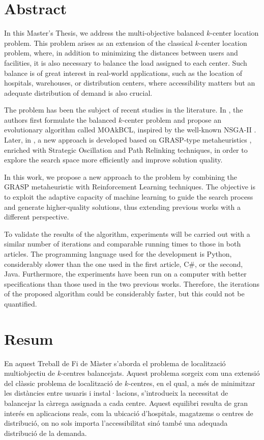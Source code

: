 \documentclass[12pt,a4paper]{book}
\begin{document}
\section*{Abstract}
In this Master's Thesis, we address the multi-objective balanced $k$-center location problem. This problem arises as an extension of the classical $k$-center location problem, where, in addition to minimizing the distances between users and facilities, it is also necessary to balance the load assigned to each center. Such balance is of great interest in real-world applications, such as the location of hospitals, warehouses, or distribution centers, where accessibility matters but an adequate distribution of demand is also crucial.

The problem has been the subject of recent studies in the literature. In \cite{k-balanced_1}, the authors first formulate the balanced $k$-center problem and propose an evolutionary algorithm called MOAkBCL, inspired by the well-known NSGA-II \citep{NSGA-II}. Later, in \cite{k-Balanced_2}, a new approach is developed based on GRASP-type metaheuristics \citep{GRASP}, enriched with Strategic Oscillation \citep{oscillation} and Path Relinking \citep{path_relinking} techniques, in order to explore the search space more efficiently and improve solution quality.

In this work, we propose a new approach to the problem by combining the GRASP metaheuristic with Reinforcement Learning techniques. The objective is to exploit the adaptive capacity of machine learning to guide the search process and generate higher-quality solutions, thus extending previous works with a different perspective.

To validate the results of the algorithm, experiments will be carried out with a similar number of iterations and comparable running times to those in both articles. The programming language used for the development is Python, considerably slower than the one used in the first article, C\#, or the second, Java. Furthermore, the experiments have been run on a computer with better specifications than those used in the two previous works. Therefore, the iterations of the proposed algorithm could be considerably faster, but this could not be quantified.

\newpage

\section*{Resum}
En aquest Treball de Fi de Màster s'aborda el problema de localització multiobjectiu de $k$-centres balancejats. Aquest problema sorgeix com una extensió del clàssic problema de localització de $k$-centres, en el qual, a més de minimitzar les distàncies entre usuaris i instal·lacions, s'introdueix la necessitat de balancejar la càrrega assignada a cada centre. Aquest equilibri resulta de gran interés en aplicacions reals, com la ubicació d'hospitals, magatzems o centres de distribució, on no sols importa l'accessibilitat sinó també una adequada distribució de la demanda.
\end{document}
